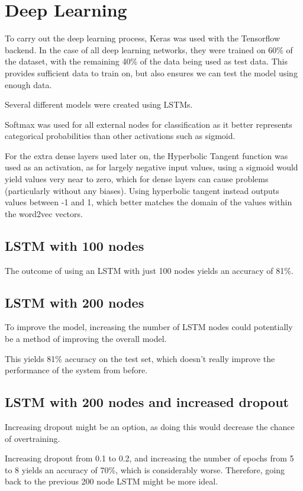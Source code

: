 \documentclass[12pt]{article}
\begin{document}
\section{Deep Learning}
To carry out the deep learning process, Keras was used with the Tensorflow backend.
In the case of all deep learning networks, they were trained on 60\% of the dataset, with the remaining 40\% of the data being used as test data.
This provides sufficient data to train on, but also ensures we can test the model using enough data.

Several different models were created using LSTMs.

Softmax was used for all external nodes for classification as it better represents categorical probabilities than other activations such as sigmoid.

For the extra dense layers used later on, the Hyperbolic Tangent function was used as an activation, as for largely negative input values, using a sigmoid
would yield values very near to zero, which for dense layers can cause problems (particularly without any biases). Using hyperbolic tangent instead outputs values
between -1 and 1, which better matches the domain of the values within the word2vec vectors. 

\subsection{LSTM with 100 nodes}
The outcome of using an LSTM with just 100 nodes yields an accuracy of 81\%.
\subsection{LSTM with 200 nodes}
To improve the model, increasing the number of LSTM nodes could potentially be a method of improving the 
overall model.

This yields 81\% accuracy on the test set, which doesn't really improve the performance of the system from before.
\subsection{LSTM with 200 nodes and increased dropout}
Increasing dropout might be an option, as doing this would decrease the chance of overtraining.

Increasing dropout from 0.1 to 0.2, and increasing the number of epochs from 5 to 8 yields an
accuracy of 70\%, which is considerably worse. Therefore, going back to the previous 200 node LSTM might be more ideal.
\end{document}
